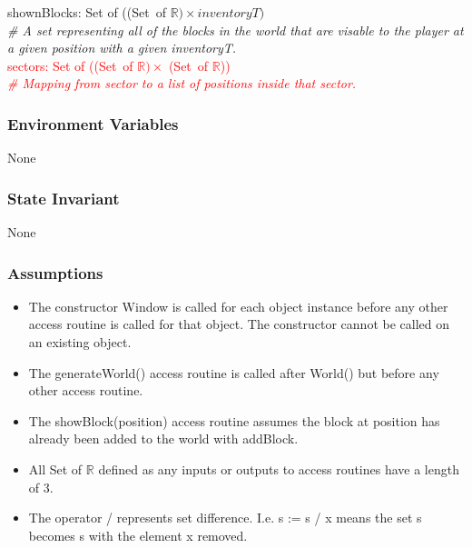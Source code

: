 \documentclass[12pt]{article}
\begin{document}
\noindent shownBlocks: Set of ((\mbox{Set of}  $\mathbb{R}) \times inventoryT)$\\ \textit{\# A set representing all of the blocks in the world that are visable to the player at a given position with a given inventoryT.}\\

\noindent \textcolor{red}{sectors: Set of ((\mbox{Set of}  $\mathbb{R}) \times$ (\mbox{Set of}  $\mathbb{R}$))}\\ 
\textit{ \textcolor{red}{ \# Mapping from sector to a list of positions inside that sector.}}\\

\subsubsection* {Environment Variables}

None

\subsubsection* {State Invariant}

None

\subsubsection* {Assumptions}

\begin{itemize}
\item The constructor Window is called for each object instance before any other
access routine is called for that object.  The constructor cannot be called on
an existing object. 

\item The generateWorld() access routine is called after World() but before any other access routine.

\item The showBlock(position) access routine assumes the block at position has already been added to the world with addBlock.

\item All Set of $\mathbb{R}$ defined as any inputs or outputs to access routines have a length of 3.


\item The operator / represents set difference. I.e. s := s / x means the set s becomes s with the element x removed.


\end{itemize}
\end{document}
